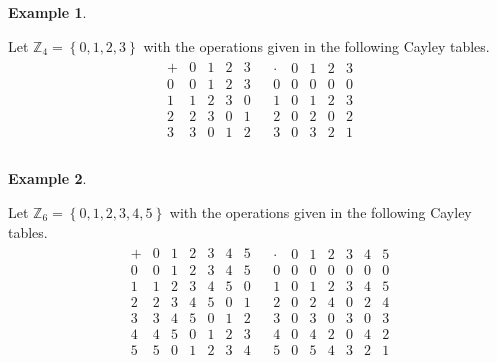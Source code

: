 \documentclass[
]{book}
\theoremstyle{definition}
\theoremstyle{definition}
\newtheorem{example}{Example}[chapter]
\theoremstyle{definition}
\theoremstyle{definition}
\theoremstyle{remark}
\begin{document}
\begin{example}
\protect\hypertarget{exm:z4ring}{}\label{exm:z4ring}

Let \(\mathbb{Z}_4=\left\{ 0,1, 2, 3 \right\}\) with the operations given in the following Cayley tables.
\[\begin{array}{cc}
\begin{array}{c|cccc}
+ & 0 & 1 & 2 & 3  \\ \hline
0 & 0 & 1 & 2 & 3 \\
1 & 1 & 2 & 3 & 0 \\
2 & 2 & 3 & 0 & 1 \\
3 & 3 & 0 & 1 & 2 \\
\end{array}
&
\begin{array}{c|cccc}
\cdot & 0 & 1 & 2 & 3 \\ \hline
0 & 0 & 0  & 0 & 0 \\
1 & 0 & 1 & 2 & 3 \\
2 & 0 & 2 & 0 & 2 \\
3 & 0 & 3 & 2 & 1 \\
\end{array}\\
\end{array}\]

\end{example}

\begin{example}
\protect\hypertarget{exm:z6ring}{}\label{exm:z6ring}

Let \(\mathbb{Z}_6=\left\{ 0,1, 2, 3, 4, 5 \right\}\) with the operations given in the following Cayley tables.
\[\begin{array}{cc}
\begin{array}{c|cccccc}
+ & 0 & 1 & 2 & 3 & 4 & 5 \\ \hline
0 & 0 & 1 & 2 & 3 & 4 & 5 \\
1 & 1 & 2 & 3 & 4 & 5 & 0\\
2 & 2 & 3 & 4 & 5 & 0 & 1 \\
3 & 3 & 4 & 5 & 0 & 1 & 2 \\
4 & 4 & 5 & 0 & 1 & 2 & 3 \\
5 & 5 & 0 & 1 & 2 & 3 & 4 \\
\end{array}
&
\begin{array}{c|cccccc}
\cdot & 0 & 1 & 2 & 3 & 4 & 5 \\ \hline
0 & 0 & 0  & 0 & 0 & 0 & 0 \\
1 & 0 & 1 & 2 & 3 & 4 & 5\\
2 & 0 & 2 & 4 & 0 & 2 & 4 \\
3 & 0 & 3 & 0 & 3 & 0 & 3 \\
4 & 0 & 4 & 2 & 0 & 4 & 2 \\
5 & 0 & 5 & 4 & 3 & 2 & 1 \\
\end{array}
\end{array}\]

\end{example}
\end{document}
